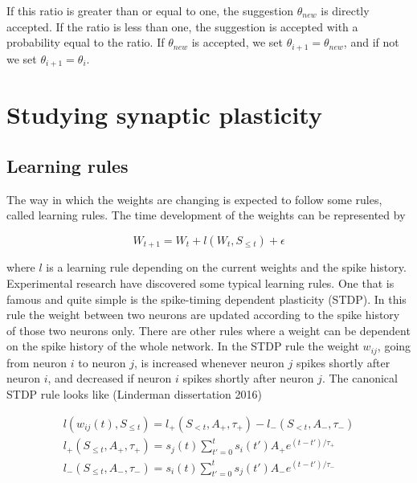 If this ratio is greater than or equal to one, the suggestion $\theta_{new}$ is directly accepted. If the ratio is less than one, the suggestion is accepted with a probability equal to the ratio. If $\theta_{new}$ is accepted, we set $\theta_{i+1} = \theta_{new}$, and if not we set $\theta_{i+1} = \theta_i$.

\section{Studying synaptic plasticity}
\subsection{Learning rules}
\label{sec:LR}

The way in which the weights are changing is expected to follow some rules, called learning rules. The time development of the weights can be represented by

\begin{equation}
\label{eq:LR}
    W_{t+1} = W_t + l(W_t, S_{\leq t}) + \epsilon
\end{equation}

where $l$ is a learning rule depending on the current weights and the spike history. Experimental research have discovered some typical learning rules. One that is famous and quite simple is the spike-timing dependent plasticity (STDP). %
In this rule the weight between two neurons are updated according to the spike history of those two neurons only. There are other rules where a weight can be dependent on the spike history of the whole network. In the STDP rule the weight $w_{ij}$, going from neuron $i$ to neuron $j$, is increased whenever neuron $j$ spikes shortly after neuron $i$, and decreased if neuron $i$ spikes shortly after neuron $j$. The canonical STDP rule looks like (Linderman dissertation 2016)

\begin{equation}
\label{eq:STDP}
    \begin{split}
    l(w_{ij}(t), S_{\leq t}) = l_+(S_{<t}, A_+,\tau_+) - l_-(S_{<t}, A_-,\tau_-)\\ 
    l_+(S_{\leq t}, A_+,\tau_+) = s_j(t) \sum_{t'=0}^{t} s_i(t') A_+ e^{(t-t')/\tau_+}\\ 
    l_-(S_{\leq t}, A_-,\tau_-) = s_i(t) \sum_{t'=0}^{t} s_j(t') A_- e^{(t-t')/\tau_-}
    \end{split}
\end{equation}

